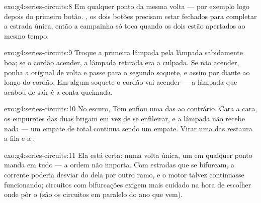 \begin{solution}{exo:g4:series-circuits:8}
Em qualquer ponto da mesma volta --- por exemplo logo depois do
primeiro botão. , os dois botões precisam estar fechados para
completar a estrada única, então a campainha só toca quando os dois
estão apertados ao mesmo tempo.
\end{solution}

\begin{solution}{exo:g4:series-circuits:9}
Troque a primeira lâmpada pela lâmpada sabidamente boa; se o cordão
acender, a lâmpada retirada era a culpada. Se não acender, ponha a
original de volta e passe para o segundo soquete, e assim por diante
ao longo do cordão. Em algum soquete o cordão vai acender --- a
lâmpada que acabou de sair é a conta queimada.
\end{solution}

\begin{solution}{exo:g4:series-circuits:10}
No escuro, Tom enfiou uma das  ao contrário. Cara a cara, os
empurrões das duas  brigam em vez de se enfileirar, e a lâmpada
não recebe nada --- um empate de  total continua sendo um
empate. Virar uma das  restaura a fila e a .
\end{solution}

\begin{solution}{exo:g4:series-circuits:11}
Ela está certa: numa volta única, um  em qualquer ponto
manda em tudo --- a ordem não importa. Com estradas que se bifurcam,
a corrente poderia desviar do  dela por outro ramo, e o
motor talvez continuasse funcionando; circuitos com bifurcações
exigem mais cuidado na hora de escolher onde pôr o  (são
os circuitos em paralelo do ano que vem).
\end{solution}
